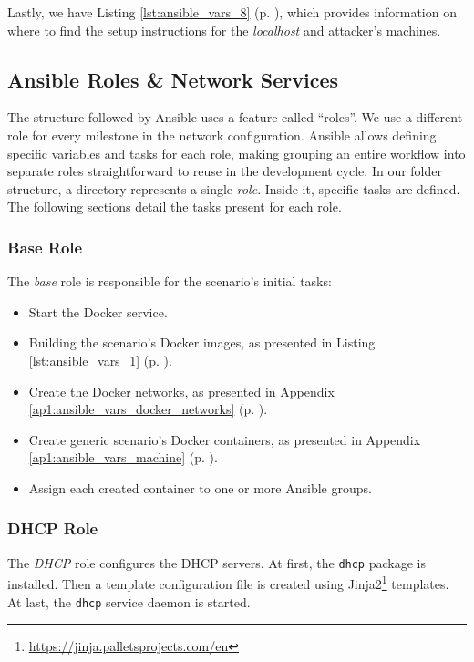 Lastly, we have Listing \ref{lst:ansible_vars_8} (p. \pageref{lst:ansible_vars_8}), which provides information on where to find the setup instructions for the \textit{localhost} and attacker's machines.

\subsection{Ansible Roles \& Network Services} \label{sec:ansible_roles}

The structure followed by Ansible uses a feature called ``roles''. We use a different role for every milestone in the network configuration. Ansible allows defining specific variables and tasks for each role, making grouping an entire workflow into separate roles straightforward to reuse in the development cycle. In our folder structure, a directory represents a single \textit{role}. Inside it, specific tasks are defined. The following sections detail the tasks present for each role. 

\subsubsection{Base Role} \label{sec:ansible_base_role}

The \textit{base} role is responsible for the scenario's initial tasks:

\begin{itemize}
    \item Start the Docker service.
    \item Building the scenario's Docker images, as presented in Listing \ref{lst:ansible_vars_1} (p. \pageref{lst:ansible_vars_1}).
    \item Create the Docker networks, as presented in Appendix \ref{ap1:ansible_vars_docker_networks} (p. \pageref{ap1:ansible_vars_docker_networks}).
    \item Create generic scenario's Docker containers, as presented in Appendix \ref{ap1:ansible_vars_machine} (p. \pageref{ap1:ansible_vars_machine}).
    \item Assign each created container to one or more Ansible groups.
\end{itemize}

\subsubsection{DHCP Role} \label{sec:ansible_dhcp_role}

The \textit{DHCP} role configures the DHCP servers. At first, the \texttt{dhcp} package is installed. Then a template configuration file is created using Jinja2\footnote{\url{https://jinja.palletsprojects.com/en}} templates. At last, the \texttt{dhcp} service daemon is started.


